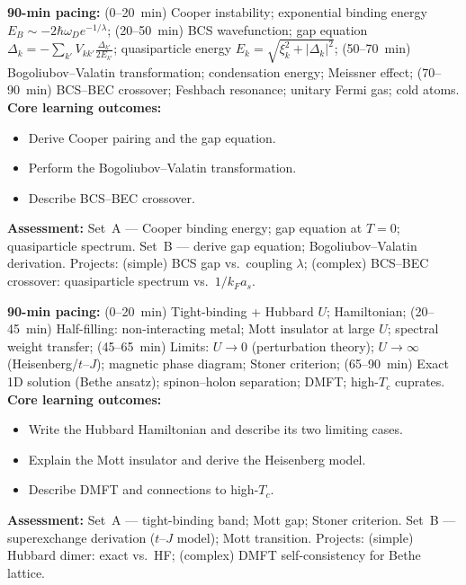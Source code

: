\documentclass[11pt,a4paper]{article}
\begin{document}
\medskip

\begin{tcolorbox}[modulebox, title={Module~II.4 --- Lecture L09: Interacting Fermions and BCS Theory}]
\textbf{90-min pacing:} (0--20~min) Cooper instability; exponential binding energy $E_B\sim-2\hbar\omega_D e^{-1/\lambda}$; (20--50~min) BCS wavefunction; gap equation $\Delta_k=-\sum_{k'}V_{kk'}\tfrac{\Delta_{k'}}{2E_{k'}}$; quasiparticle energy $E_k=\sqrt{\xi_k^2+|\Delta_k|^2}$; (50--70~min) Bogoliubov--Valatin transformation; condensation energy; Meissner effect; (70--90~min) BCS--BEC crossover; Feshbach resonance; unitary Fermi gas; cold atoms.
\medskip\textbf{Core learning outcomes:}
\begin{itemize}[leftmargin=1.4em,topsep=2pt,itemsep=1pt]
  \item Derive Cooper pairing and the gap equation.
  \item Perform the Bogoliubov--Valatin transformation.
  \item Describe BCS--BEC crossover.
\end{itemize}
\medskip\textbf{Assessment:}
Set~A --- Cooper binding energy; gap equation at $T=0$; quasiparticle spectrum.
Set~B --- derive gap equation; Bogoliubov--Valatin derivation.
Projects: (simple) BCS gap vs.\ coupling $\lambda$; (complex) BCS--BEC crossover: quasiparticle spectrum vs.\ $1/k_Fa_s$.
\end{tcolorbox}

\medskip

\begin{tcolorbox}[modulebox, title={Module~II.4 --- Lecture L10: The Hubbard Model}]
\textbf{90-min pacing:} (0--20~min) Tight-binding + Hubbard $U$; Hamiltonian; (20--45~min) Half-filling: non-interacting metal; Mott insulator at large $U$; spectral weight transfer; (45--65~min) Limits: $U\to0$ (perturbation theory); $U\to\infty$ (Heisenberg/$t$--$J$); magnetic phase diagram; Stoner criterion; (65--90~min) Exact 1D solution (Bethe ansatz); spinon--holon separation; DMFT; high-$T_c$ cuprates.
\medskip\textbf{Core learning outcomes:}
\begin{itemize}[leftmargin=1.4em,topsep=2pt,itemsep=1pt]
  \item Write the Hubbard Hamiltonian and describe its two limiting cases.
  \item Explain the Mott insulator and derive the Heisenberg model.
  \item Describe DMFT and connections to high-$T_c$.
\end{itemize}
\medskip\textbf{Assessment:}
Set~A --- tight-binding band; Mott gap; Stoner criterion.
Set~B --- superexchange derivation ($t$--$J$ model); Mott transition.
Projects: (simple) Hubbard dimer: exact vs.\ HF; (complex) DMFT self-consistency for Bethe lattice.
\end{tcolorbox}
\end{document}
